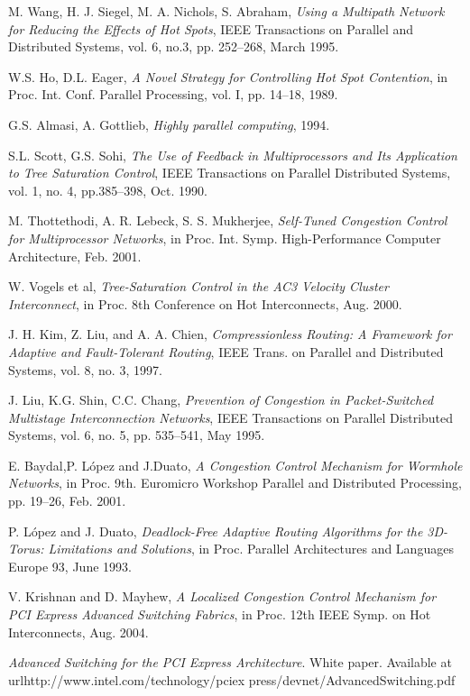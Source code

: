 \documentclass[12pt]{article}
\begin{document}
\begin{thebibliography}{99}
 M. Wang, H. J. Siegel, M. A. Nichols, S. Abraham, \emph{Using a Multipath Network for Reducing the Effects of Hot Spots}, IEEE Transactions on Parallel and Distributed Systems, vol. 6, no.3, pp. 252--268, March 1995.

 W.S. Ho, D.L. Eager, \emph{A Novel Strategy for Controlling Hot Spot Contention}, in Proc. Int. Conf. Parallel Processing, vol. I, pp. 14--18, 1989.

 G.S. Almasi, A. Gottlieb, \emph{Highly parallel computing}, 1994.

 S.L. Scott, G.S. Sohi, \emph{The Use of Feedback in Multiprocessors and Its Application to Tree Saturation Control}, IEEE Transactions on Parallel Distributed Systems, vol. 1, no. 4, pp.385--398, Oct. 1990.

 M. Thottethodi, A. R. Lebeck, S. S. Mukherjee, \emph{Self-Tuned Congestion Control for Multiprocessor Networks}, in Proc. Int. Symp. High-Performance Computer Architecture, Feb. 2001.

 W. Vogels et al, \emph{Tree-Saturation Control in the AC3 Velocity Cluster Interconnect}, in Proc. 8th Conference on Hot Interconnects, Aug. 2000.

 J. H. Kim, Z. Liu, and A. A. Chien, \emph{Compressionless Routing: A Framework for Adaptive and Fault-Tolerant Routing}, IEEE Trans. on Parallel and Distributed Systems, vol. 8, no. 3, 1997.

 J. Liu, K.G. Shin, C.C. Chang, \emph{Prevention of Congestion in Packet-Switched Multistage Interconnection Networks}, IEEE Transactions on Parallel Distributed Systems, vol. 6, no. 5, pp. 535--541, May 1995.

 E. Baydal,P. L\'opez and J.Duato, \emph{A Congestion Control Mechanism for Wormhole Networks}, in Proc. 9th. Euromicro Workshop Parallel and Distributed Processing, pp. 19--26, Feb. 2001.

 P. L\'opez and J. Duato, \emph{Deadlock-Free Adaptive Routing Algorithms for the 3D-Torus: Limitations and Solutions}, in Proc. Parallel Architectures and Languages Europe 93, June 1993.

 V. Krishnan and D. Mayhew, \emph{A Localized Congestion Control Mechanism for PCI Express Advanced Switching Fabrics}, in Proc. 12th IEEE Symp. on Hot Interconnects, Aug. 2004.

 \emph{Advanced Switching for the PCI Express Architecture}. White paper. Available at
url{http://www.intel.com/technology/pciex press/devnet/AdvancedSwitching.pdf}

\end{thebibliography}
\end{document}
